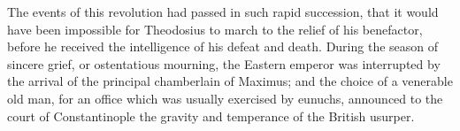 
The events of this revolution had passed in such rapid
succession, that it would have been impossible for Theodosius to
march to the relief of his benefactor, before he received the
intelligence of his defeat and death. During the season of
sincere grief, or ostentatious mourning, the Eastern emperor was
interrupted by the arrival of the principal chamberlain of
Maximus; and the choice of a venerable old man, for an office
which was usually exercised by eunuchs, announced to the court of
Constantinople the gravity and temperance of the British usurper.

